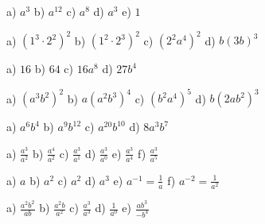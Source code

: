 \begin{tehtavasivu}
\begin{tehtava}
        \begin{vastaus}
            a) $a^3$ \qquad
            b) $a^{12}$ \qquad
            c) $a^8$ \qquad
            d) $a^3$ \qquad
            e) $1$
        \end{vastaus}
    \end{tehtava}
    
       \begin{tehtava}
        a) $(1^3\cdot 2^2)^2$ \qquad
        b) $(1^2\cdot 2^3)^2$ \qquad
        c) $(2^2a^4)^2$ \qquad
        d) $b(3b)^3$

        \begin{vastaus}
            a) $16$ \qquad
            b) $64$ \qquad
            c) $16a^8$ \qquad
            d) $27b^4$
        \end{vastaus}
    \end{tehtava}
    
    \begin{tehtava}
        a) $(a^3b^2)^2$ \qquad
        b) $a(a^2b^3)^4$ \qquad
        c) $(b^2a^4)^5$ \qquad
        d) $b(2ab^2)^3$
        
        \begin{vastaus}
            a) $a^6b^4$ \qquad
            b) $a^9b^{12}$ \qquad
            c) $a^{20}b^{10}$ \qquad
            d) $8a^3b^7$
        \end{vastaus}
    \end{tehtava}
      
    \begin{tehtava}
        a) $\frac{a^3}{a^2}$ \qquad
        b) $\frac{a^4}{a^2}$ \qquad
        c) $\frac{a^3}{a^1}$ \qquad
        d) $\frac{a^3}{a^0}$ \qquad
        e) $\frac{a^3}{a^4}$ \qquad
        f) $\frac{a^3}{a^5}$
        
        \begin{vastaus}
            a) $a$ \qquad
            b) $a^2$ \qquad
            c) $a^2$ \qquad
            d) $a^3$ \qquad
            e) $a^{-1} = \frac{1}{a}$ \qquad
            f) $a^{-2} = \frac{1}{a^2}$
        \end{vastaus}
    \end{tehtava}
    
    \begin{tehtava}
        a) $\frac{a^2b^2}{ab}$ \qquad
        b) $\frac{a^2b}{a^2}$ \qquad
        c) $\frac{a^3}{a^3}$ \qquad
        d) $\frac{1}{a^0}$ \qquad
        e) $\frac{ab^3}{-b^4}$
        

\end{tehtava}
\end{tehtavasivu}
